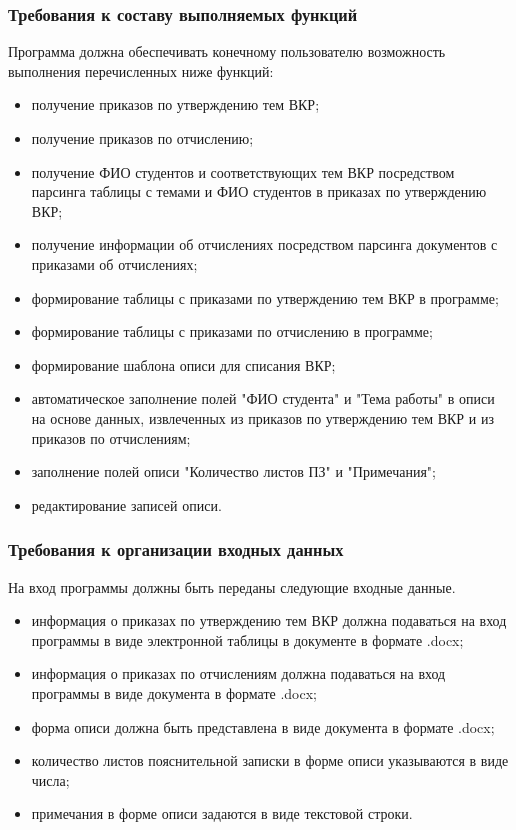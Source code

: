 \documentclass[14pt, a4paper]{extarticle}
\begin{document}
	\subsubsection{Требования к составу выполняемых функций}
	Программа должна обеспечивать конечному пользователю возможность выполнения перечисленных ниже функций:
	\begin{itemize}
		\item получение приказов по утверждению тем ВКР;
		\item получение приказов по отчислению;
		\item получение ФИО студентов и соответствующих тем ВКР посредством парсинга таблицы с темами и ФИО студентов в приказах по утверждению ВКР;
		\item получение информации об отчислениях посредством парсинга документов с приказами об отчислениях;
		\item формирование таблицы с приказами по утверждению тем ВКР в программе;
		\item формирование таблицы с приказами по отчислению в программе;
		\item формирование шаблона описи для списания ВКР;
		\item автоматическое заполнение полей "ФИО студента" и "Тема работы" в описи на основе данных, извлеченных из приказов по утверждению тем ВКР и из приказов по отчислениям;
		\item заполнение полей описи "Количество листов ПЗ" и "Примечания";
		\item редактирование записей описи.
		
	\end{itemize}
	
	\subsubsection{Требования к организации входных данных}
	На вход программы должны быть переданы следующие входные данные.
	\begin{itemize}
		\item информация о приказах по утверждению тем ВКР должна подаваться на вход программы в виде электронной таблицы в документе в формате .docx;
		\item информация о приказах по отчислениям должна подаваться на вход программы в виде документа в формате .docx;
		\item форма описи должна быть представлена в виде документа в формате .docx;
		\item количество листов пояснительной записки в форме описи указываются в виде числа;
		\item примечания в форме описи задаются в виде текстовой строки.
	\end{itemize}
	
\end{document}
